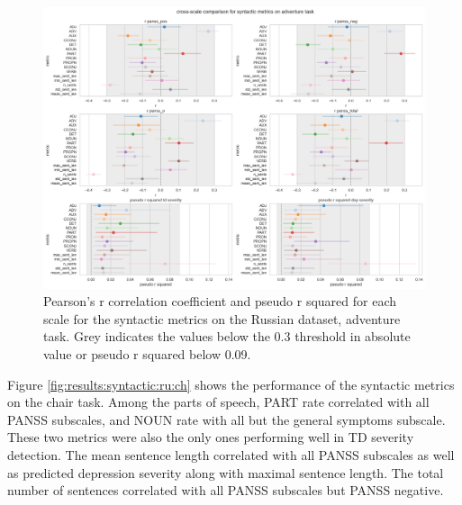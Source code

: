\begin{figure}[ht!]
    \includegraphics[width=1.1\textwidth, center]{Figures/chapter_4/syntactic/ru_adventure_scale_r.png} 
\captionsetup{width=\textwidth}
\caption[Syntactic Metrics: Russian, Adventure Task]{\label{fig:results:syntactic:ru:ad} Pearson's r correlation coefficient and pseudo r squared for each scale for the syntactic metrics on the Russian dataset, adventure task. Grey indicates the values below the 0.3 threshold in absolute value or pseudo r squared below 0.09.}
\end{figure}

\clearpage
Figure \ref{fig:results:syntactic:ru:ch} shows the performance of the syntactic metrics on the chair task. Among the parts of speech, PART rate correlated with all PANSS subscales, and NOUN rate with all but the general symptoms subscale. These two metrics were also the only ones performing well in TD severity detection. The mean sentence length correlated with all PANSS subscales as well as predicted depression severity along with maximal sentence length. The total number of sentences correlated with all PANSS subscales but PANSS negative.

